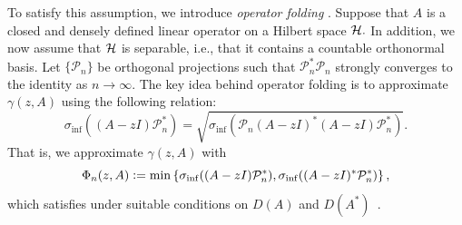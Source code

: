 
To satisfy this assumption, we introduce \textit{operator folding} \cite[Section 3.4]{Matt}. Suppose that $A$ is a closed and densely defined linear operator on a Hilbert space $\mathcal{H}.$ In addition, we now assume that $\mathcal{H}$ is separable, i.e., that it contains a countable orthonormal basis. Let $\{\mathcal{P}_n\}$ be orthogonal projections such that $\mathcal{P}_n^*\mathcal{P}_n$ strongly converges to the identity as $n \rightarrow \infty$. 
The key idea behind operator folding is to approximate $\gamma(z, A)$ using the following relation:
\begin{equation}
    \sigma_{\inf}((A-zI)\mathcal{P}_n^*) =  \sqrt{\sigma_{\inf}(\mathcal{P}_n(A-zI)^*(A-zI)\mathcal{P}_n^*)}.
\end{equation}
That is, we approximate $\gamma(z, A)$ with 
\begin{equation} \label{phi Pn}
    \Phi_n(z, A) \vcentcolon= \min \left\{\sigma_{\inf}((A-zI) \mathcal{P}_n^*), \sigma_{\inf}((A-zI)^*\mathcal{P}_n^*) \right\},
\end{equation}
which satisfies  under suitable conditions on $D(A)$ and $D(A^*)$~\cite[Chapter~3]{kato}. 


